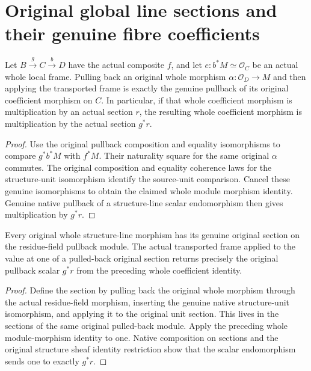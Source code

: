 \section{Original global line sections and their genuine fibre coefficients}

\begin{lemma}
\label{lem:fc-original-line-section-frame-naturality}
\leanok
{}
Let $B\xrightarrow{g}C\xrightarrow{b}D$ have the actual composite $f$, and let
$e:b^*M\simeq\mathcal O_C$ be an actual whole local frame.  Pulling back an
original whole morphism $\alpha:\mathcal O_D\to M$ and then applying the
transported frame is exactly the genuine pullback of its original coefficient
morphism on $C$.  In particular, if that whole coefficient morphism is
multiplication by an actual section $r$, the resulting whole coefficient
morphism is multiplication by the actual section $g^*r$.
\end{lemma}
\begin{proof}
Use the original pullback composition and equality isomorphisms to compare
$g^*b^*M$ with $f^*M$.  Their naturality square for the same original
$\alpha$ commutes.  The original composition and equality coherence laws for
the structure-unit isomorphism identify the source-unit comparison.
Cancel these genuine isomorphisms to obtain the claimed whole module
morphism identity.  Genuine native pullback of a structure-line scalar
endomorphism then gives multiplication by $g^*r$.
\end{proof}

\begin{lemma}
\label{lem:fc-original-line-section-fibre}
\leanok
{}
Every original whole structure-line morphism has its genuine original
section on the residue-field pullback module.  The actual transported
frame applied to the value at one of a pulled-back original section returns
precisely the original pullback scalar $g^*r$ from the preceding whole
coefficient identity.
\end{lemma}
\begin{proof}
Define the section by pulling back the original whole morphism through the
actual residue-field morphism, inserting the genuine native structure-unit
isomorphism, and applying it to the original unit section.  This lives in
the sections of the same original pulled-back module.  Apply the preceding
whole module-morphism identity to one.  Native composition on sections
and the original structure sheaf identity restriction show that the scalar
endomorphism sends one to exactly $g^*r$.
\end{proof}
